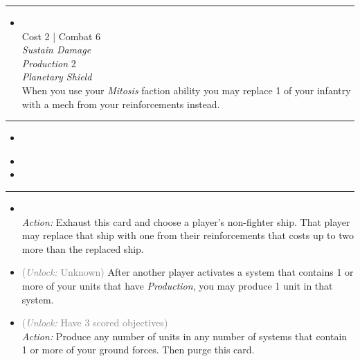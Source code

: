 \begin{multicols}{2}
\vspace{-10pt}\rule{\hsize}{0.4pt}\vspace{5pt}


\begin{itemize}
\item {} %
\\
Cost 2 | Combat 6 \\
\emph{Sustain Damage}\\
\emph{Production} 2\\
\emph{Planetary Shield}\\
When you use your \emph{Mitosis}
faction ability you may replace 1 of your infantry with a mech from your reinforcements instead. 
\end{itemize}

\vspace{-10pt}\rule{\hsize}{0.4pt}\vspace{5pt}


\begin{itemize}
\item {}
\end{itemize}

\columnbreak
{}

\begin{itemize}
\item {}
\item \bioplasmosis
\end{itemize}

\vspace{-10pt}\rule{\hsize}{0.4pt}\vspace{5pt}


\begin{itemize}
\item {}\\
\emph{Action:}
Exhaust this card and choose a player's non-fighter ship. That player may replace that ship with one from their reinforcements that costs up to two more than the replaced ship.
\item {} \textcolor{gray}{(\emph{Unlock:} Unknown)} %
After another player activates a system that contains 1 or more of your units that have \emph{Production},
you may produce 1 unit in that system.
\item {} \textcolor{gray}{(\emph{Unlock:} Have 3 scored objectives)}\\
\emph{Action:} Produce any number of units in any number of systems that contain 1 or more of your ground forces. Then purge this card.
\end{itemize}


\end{multicols}
